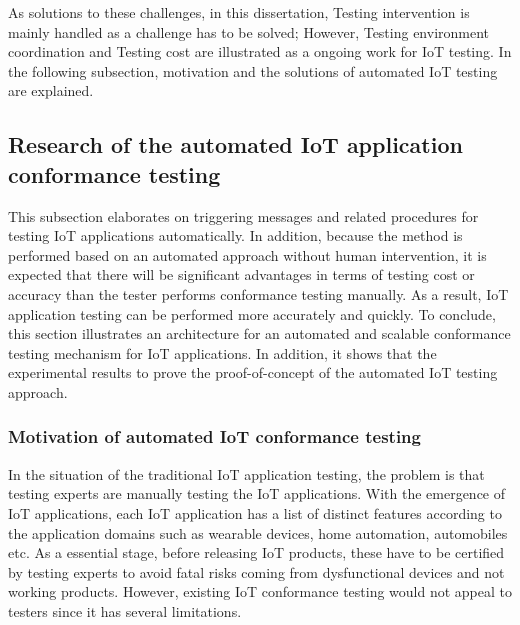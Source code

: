 As solutions to these challenges, in this dissertation, Testing intervention is mainly handled as a challenge has to be solved; However, Testing environment coordination and Testing cost are illustrated as a ongoing work for IoT testing. In the following subsection, motivation and the solutions of automated IoT testing are explained.

\subsection{Research of the automated IoT application conformance testing}
This subsection elaborates on triggering messages and related procedures for testing IoT applications automatically. In addition, because the method is performed based on an automated approach without human intervention, it is expected that there will be significant advantages in terms of testing cost or accuracy than the tester performs conformance testing manually. As a result, IoT application testing can be performed more accurately and quickly. To conclude, this section illustrates an architecture for an automated and scalable conformance testing mechanism for IoT applications. In addition, it shows that the experimental results to prove the proof-of-concept of the automated IoT testing approach.

\subsubsection{Motivation of automated IoT conformance testing}
In the situation of the traditional IoT application testing, the problem is that testing experts are manually testing the IoT applications. With the emergence of IoT applications, each IoT application has a list of distinct features according to the application domains such as wearable devices, home automation, automobiles etc. As a essential stage, before releasing IoT products, these have to be certified by testing experts to avoid fatal risks coming from dysfunctional devices and not working products. However, existing IoT conformance testing would not appeal to testers since it has several limitations.

